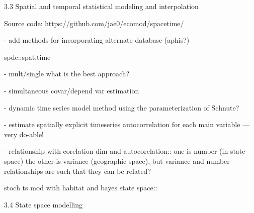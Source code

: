 \documentclass[letterpaper,portrait,12pt]{scrartcl}
\numberwithin{equation}{section}		%
\numberwithin{figure}{section}			%
\numberwithin{table}{section}				%
\begin{document}
3.3  Spatial and temporal statistical modeling and interpolation














Source code: https://github.com/jae0/ecomod/spacetime/














- add methods for incorporating alternate database (aphis?)



\begin{flushleft}

	spde::spat.time

\end{flushleft}



- mult/single what is the best approach?




- simultaneous covar/depend var estimation




- dynamic time series model method using the parameterization of Schnute?




- estimate spatially explicit timeseries autocorrelation for each main variable --- very do-able!




- relationship with corelation dim and autocorelation:: one is number (in state space) the other is variance (geographic space), but variance and number relationships are such that they can be related?



\begin{flushleft}

	stoch ts mod with habitat and bayes state space::

\end{flushleft}








3.4 State space modelling
\end{document}
